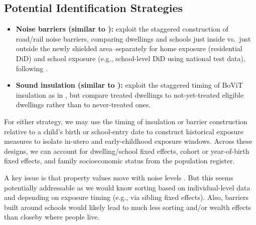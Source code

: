 \documentclass[11pt]{article}
\begin{document}
\subsection*{Potential Identification Strategies}

\begin{itemize}
\item \textbf{Noise barriers (similar to \cite{morettiTrafficNoiseExternality2025}):} exploit the staggered construction of road/rail noise barriers, comparing dwellings and schools just inside vs.\ just outside the newly shielded area--separately for home exposure (residential DiD) and school exposure (e.g., school-level DiD using national test data), following \textcite{morettiTrafficNoiseExternality2025}. 
\item \textbf{Sound insulation (similar to \cite{lindgrenSoundEnvironmentHealth2021}):} exploit the staggered timing of BoViT insulation as in \textcite{lindgrenSoundEnvironmentHealth2021}, but compare treated dwellings to not-yet-treated eligible dwellings rather than to never-treated ones.
\end{itemize}

For either strategy, we may use the timing of insulation or barrier construction relative to a child's birth or school-entry date to construct historical exposure measures to isolate in-utero and early-childhood exposure windows. Across these designs, we can account for dwelling/school fixed effects, cohort or year-of-birth fixed effects, and family socioeconomic status from the population register.

A key issue is that property values move with noise levels \parencite{allroggenPlanesOverheadHow2025, morettiTrafficNoiseExternality2025}. But this seems potentially addressable as we would know sorting based on individual-level data and depending on exposure timing (e.g., via sibling fixed effects). Also, barriers built around schools would likely lead to much less sorting and/or wealth effects than closeby where people live.
\end{document}
